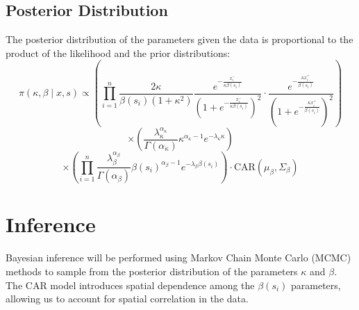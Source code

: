 \documentclass{article}
\begin{document}
\subsection*{Posterior Distribution}

The posterior distribution of the parameters given the data is proportional to the product of the likelihood and the prior distributions:
\[
\pi(\kappa, \beta \mid x, s) \propto \left( \prod_{i=1}^{n} \frac{2\kappa}{\beta(s_i)(1 + \kappa^2)} \frac{e^{-\frac{x^-_i}{\kappa \beta(s_i)}}}{(1 + e^{-\frac{x^-_i}{\kappa \beta(s_i)}})^2} \cdot \frac{e^{-\frac{\kappa x^+_i}{\beta(s_i)}}}{(1 + e^{-\frac{\kappa x^+_i}{\beta(s_i)}})^2} \right)
\]
\[
\times \left( \frac{\lambda_{\kappa}^{\alpha_{\kappa}}}{\Gamma(\alpha_{\kappa})} \kappa^{\alpha_{\kappa} - 1} e^{-\lambda_{\kappa} \kappa} \right)
\]
\[
\times \left( \prod_{i=1}^{n} \frac{\lambda_{\beta}^{\alpha_{\beta}}}{\Gamma(\alpha_{\beta})} \beta(s_i)^{\alpha_{\beta} - 1} e^{-\lambda_{\beta} \beta(s_i)} \right) \cdot \text{CAR}(\mu_\beta, \Sigma_\beta)
\]

\section*{Inference}

Bayesian inference will be performed using Markov Chain Monte Carlo (MCMC) methods to sample from the posterior distribution of the parameters \( \kappa \) and \( \beta \). The CAR model introduces spatial dependence among the \( \beta(s_i) \) parameters, allowing us to account for spatial correlation in the data.
\end{document}
